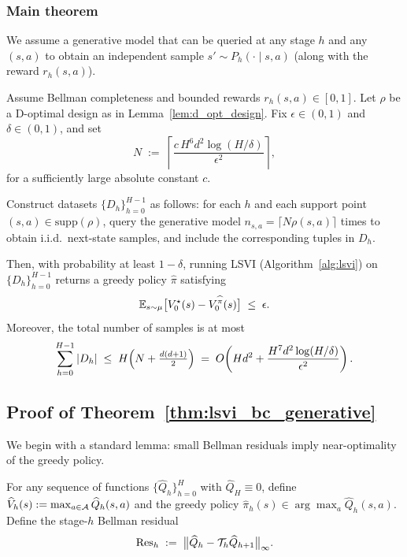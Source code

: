 \subsubsection{Main theorem}
\label{subsubsec:BC_main_thm}

We assume a generative model that can be queried at any stage $h$ and any
$(s,a)$ to obtain an independent sample $s'\sim P_h(\cdot\mid s,a)$ (along with
the reward $r_h(s,a)$).

\begin{theorem}
\label{thm:lsvi_bc_generative}
Assume Bellman completeness and bounded rewards
$r_h(s,a)\in[0,1]$. Let $\rho$ be a D-optimal design as in
Lemma~\ref{lem:d_opt_design}. Fix $\epsilon\in(0,1)$ and $\delta\in(0,1)$, and set
\[
N \;:=\; \left\lceil \frac{c\,H^6 d^2 \log(H/\delta)}{\epsilon^2}\right\rceil,
\]
for a sufficiently large absolute constant $c$.

Construct datasets $\{D_h\}_{h=0}^{H-1}$ as follows: for each $h$ and each support
point $(s,a)\in\mathrm{supp}(\rho)$, query the generative model
$n_{s,a}=\lceil N\rho(s,a)\rceil$ times to obtain i.i.d.\ next-state samples, and
include the corresponding tuples in $D_h$.

Then, with probability at least $1-\delta$, running LSVI
(Algorithm~\ref{alg:lsvi}) on $\{D_h\}_{h=0}^{H-1}$ returns a greedy policy
$\widehat\pi$ satisfying
\[
\mathbb{E}_{s\sim\mu}\big[V_0^\star(s) - V_0^{\widehat\pi}(s)\big] \;\le\; \epsilon.
\]
Moreover, the total number of samples is at most
\[
\sum_{h=0}^{H-1} |D_h|
\;\le\;
H\Bigl(N + \tfrac{d(d+1)}{2}\Bigr)
\;=\;
O\!\left(Hd^2 + \frac{H^7 d^2 \log(H/\delta)}{\epsilon^2}\right).
\]
\end{theorem}

\subsection{Proof of Theorem~\ref{thm:lsvi_bc_generative}}
\label{subsubsec:BC_main_proof}

We begin with a standard lemma: small Bellman residuals imply near-optimality of
the greedy policy.

For any sequence of functions $\{\widehat Q_h\}_{h=0}^{H}$ with $\widehat Q_H\equiv 0$,
define $\widehat V_h(s):=\max_{a\in\mathcal{A}}\widehat Q_h(s,a)$ and the greedy policy
$\widehat\pi_h(s)\in\arg\max_a \widehat Q_h(s,a)$. Define the stage-$h$ Bellman
residual
\[
\mathrm{Res}_h \;:=\; \big\|\widehat Q_h - \mathcal{T}_h \widehat Q_{h+1}\big\|_\infty.
\]

